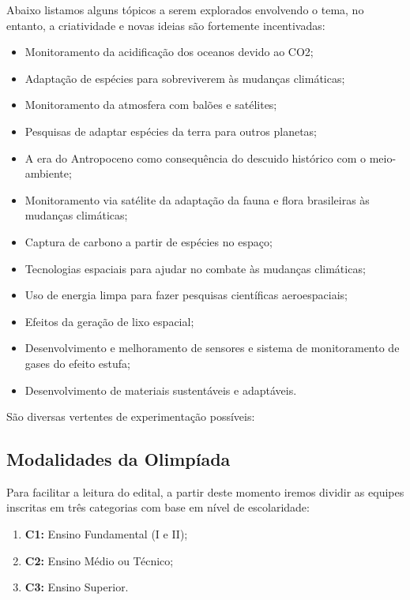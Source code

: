     \par Abaixo listamos alguns tópicos a serem explorados envolvendo o tema, no entanto, a criatividade
    e novas ideias são fortemente incentivadas:

    \begin{itemize}
        \item Monitoramento da acidificação dos oceanos devido ao CO2;
        \item Adaptação de espécies para sobreviverem às mudanças climáticas;
        \item Monitoramento da atmosfera com balões e satélites;
        \item Pesquisas de adaptar espécies da terra para outros planetas;
        \item A era do Antropoceno como consequência do descuido histórico com o meio-ambiente;
        \item Monitoramento via satélite da adaptação da fauna e flora brasileiras às mudanças climáticas;
        \item Captura de carbono a partir de espécies no espaço;
        \item Tecnologias espaciais para ajudar no combate às mudanças climáticas;
        \item Uso de energia limpa para fazer pesquisas científicas aeroespaciais;
        \item Efeitos da geração de lixo espacial;
        \item Desenvolvimento e melhoramento de sensores e sistema de monitoramento de gases do efeito estufa;
        \item Desenvolvimento de materiais sustentáveis e adaptáveis.
    \end{itemize}

    \par São diversas vertentes de experimentação possíveis: 

    
    \subsection{Modalidades da Olimpíada} \label{sec:modalidades}
        Para facilitar a leitura do edital, a partir deste momento iremos dividir as equipes inscritas em três categorias com base em nível de escolaridade:
        \begin{enumerate}
            \item \textbf{C1:} Ensino Fundamental (I e II);
            \item \textbf{C2:} Ensino Médio ou Técnico;
            \item \textbf{C3:} Ensino Superior.
        \end{enumerate}

